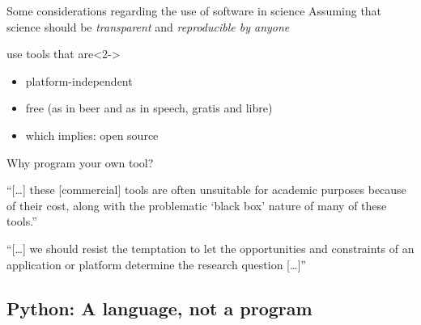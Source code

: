 \documentclass{beamer}
\begin{document}
\begin{frame}{Some considerations regarding the use of software in science}
	Assuming that science should be \emph{transparent} and \emph{reproducible by anyone}\onslide<2->{, we should}
	\begin{block}{use tools that are}<2->
		\begin{itemize}
			\item platform-independent 
			\item free (as in beer and as in speech, gratis and libre)
			\item which implies: open source
		\end{itemize}
	\end{block}
\end{frame}

\begin{frame}{Why program your own tool?}
\begin{block}{\textcite{Vis2013}}
``{[}\ldots{]} these {[}commercial{]} tools are often unsuitable for academic purposes because of their cost, along with the problematic `black box' nature of many of these tools.''
\end{block}

\begin{block}{\textcite{Mahrt2013}}
``{[}\ldots{]} we should resist the temptation to let the opportunities and constraints of an application or platform determine the research question {[}\ldots{]}''
\end{block}
	
\end{frame}






\subsection{Python: A language, not a program}
\end{document}
